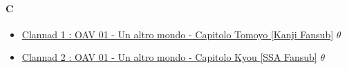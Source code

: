 		\paragraph{C} \hypertarget{OC}{}
			\begin{itemize}
				
				\item \href{https://mega.nz/#!R81BzDBb!OzIYHjfzXLp0M4S7VS9V__-46u7v3BEZ4HCYKp1Cxv0} {Clannad 1 : OAV 01 - Un altro mondo - Capitolo Tomoyo [Kanji Fansub]}  $\theta$ \\ 
				\item \href{https://mega.nz/#!pg8UgAAZ!RwYMgAYtoLWmLHmEBvSkiqcYl3P6QT4gdDa8jrwkFmc} {Clannad 2 : OAV 01 - Un altro mondo - Capitolo Kyou [SSA Fansub]}  $\theta$ 
				 	
			\end{itemize}	
			
			
